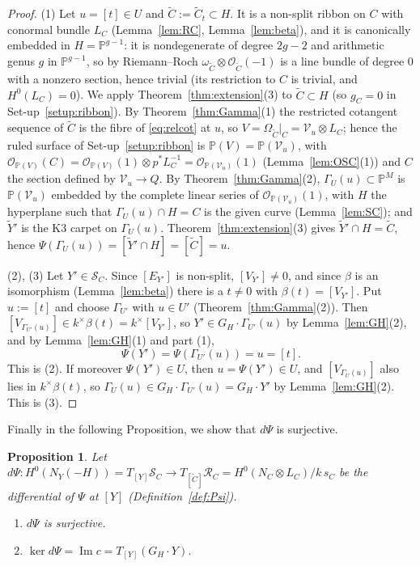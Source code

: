 \documentclass[11pt,reqno]{amsart}
\theoremstyle{plain}
\newtheorem{proposition}[theorem]{Proposition}
\theoremstyle{definition}
\newcommand{\PP}{\mathbb{P}}
\newcommand{\PM}{\mathbb{P}^M}
\newcommand{\OO}{\mathcal{O}}
\renewcommand{\Im}{\operatorname{Im}}
\newcommand{\Yt}{\widetilde{Y}}
\newcommand{\Ct}{\widetilde{C}}
\newcommand{\NY}{N_{Y}}
\newcommand{\SC}{\mathcal{S}_C}
\newcommand{\RC}{\mathcal{R}_C}
\newcommand{\GH}{G_H}
\begin{document}
\begin{proof}
(1) Let $u=[t]\in U$ and $\Ct:=\Ct_t\subset H$. It is a non-split ribbon on $C$ with conormal bundle $L_C$ (Lemma~\ref{lem:RC}, Lemma~\ref{lem:beta}), and it is canonically embedded in $H=\PP^{g-1}$: it is nondegenerate of degree $2g-2$ and arithmetic genus $g$ in $\PP^{g-1}$, so by Riemann--Roch $\omega_{\Ct}\otimes\OO_{\Ct}(-1)$ is a line bundle of degree $0$ with a nonzero section, hence trivial (its restriction to $C$ is trivial, and $H^0(L_C)=0$). We apply Theorem~\ref{thm:extension}(3) to $\Ct\subset H$ (so $g_C=0$ in Set-up~\ref{setup:ribbon}). By Theorem~\ref{thm:Gamma}(1) the restricted cotangent sequence of $\Ct$ is the fibre of \eqref{eq:relcot} at $u$, so $V=\Omega_{\Ct}|_C=\mathcal V_u\otimes L_C$; hence the ruled surface of Set-up~\ref{setup:ribbon} is $\PP(V)=\PP(\mathcal V_u)$, with $\OO_{\PP(V)}(C)=\OO_{\PP(V)}(1)\otimes p^*L_C^{-1}=\OO_{\PP(\mathcal V_u)}(1)$ (Lemma~\ref{lem:OSC}(1)) and $C$ the section defined by $\mathcal V_u\to Q$. By Theorem~\ref{thm:Gamma}(2), $\Gamma_U(u)\subset\PM$ is $\PP(\mathcal V_u)$ embedded by the complete linear series of $\OO_{\PP(\mathcal V_u)}(1)$, with $H$ the hyperplane such that $\Gamma_U(u)\cap H=C$ is the given curve (Lemma~\ref{lem:SC}); and $\Yt'$ is the K3 carpet on $\Gamma_U(u)$. Theorem~\ref{thm:extension}(3) gives $\Yt'\cap H=\Ct$, hence $\Psi(\Gamma_U(u))=[\Yt'\cap H]=[\Ct]=u$.

(2), (3) Let $Y'\in\SC$. Since $[E_{Y'}]$ is non-split, $[V_{Y'}]\ne0$, and since $\beta$ is an isomorphism (Lemma~\ref{lem:beta}) there is a $t\ne0$ with $\beta(t)=[V_{Y'}]$. Put $u:=[t]$ and choose $\Gamma_{U'}$ with $u\in U'$ (Theorem~\ref{thm:Gamma}(2)). Then $[V_{\Gamma_{U'}(u)}]\in k^{\times}\beta(t)=k^{\times}[V_{Y'}]$, so $Y'\in\GH\cdot\Gamma_{U'}(u)$ by Lemma~\ref{lem:GH}(2), and by Lemma~\ref{lem:GH}(1) and part (1),
\[
\Psi(Y')=\Psi(\Gamma_{U'}(u))=u=[t] .
\]
This is (2). If moreover $\Psi(Y')\in U$, then $u=\Psi(Y')\in U$, and $[V_{\Gamma_U(u)}]$ also lies in $k^{\times}\beta(t)$, so $\Gamma_U(u)\in\GH\cdot\Gamma_{U'}(u)=\GH\cdot Y'$ by Lemma~\ref{lem:GH}(2). This is (3).
\end{proof}

Finally in the following Proposition, we show that $d\Psi$ is surjective.

\begin{proposition}\label{prop:dPsi}
Let $d\Psi\colon H^0(\NY(-H))=T_{[Y]}\SC\to T_{[\Ct]}\RC=H^0(N_C\otimes L_C)/k\,s_C$ be the differential of $\Psi$ at $[Y]$ (Definition~\ref{def:Psi}).
\begin{enumerate}
\item $d\Psi$ is surjective.
\item $\ker d\Psi=\Im c=T_{[Y]}(\GH\cdot Y)$.
\end{enumerate}
\end{proposition}
\end{document}
